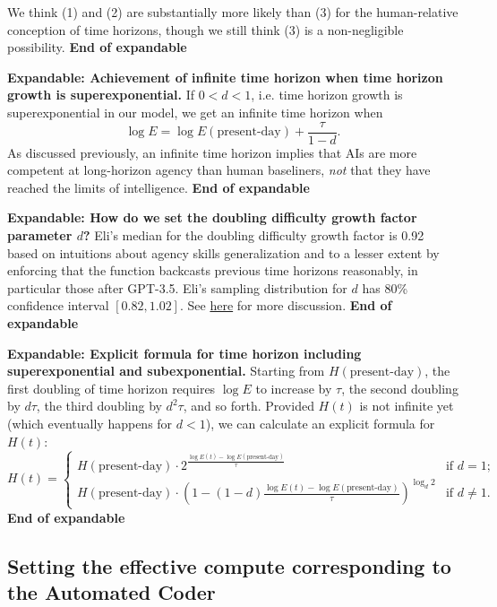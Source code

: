 \documentclass{article}
\theoremstyle{definition}
\begin{document}
We think (1) and (2) are substantially more likely than (3) for the human-relative conception of time horizons, though we still think (3) is a non-negligible possibility. \textbf{End of expandable}

\textbf{Expandable: Achievement of infinite time horizon when time horizon growth is superexponential.} If $0 < d < 1$, i.e. time horizon growth is superexponential in our model, we get an infinite time horizon when
\[ \log E = \log E(\text{present-day}) + \frac{\tau}{1-d}.\]
As discussed previously, an infinite time horizon implies that AIs are more competent at long-horizon agency than human baseliners, \textit{not} that they have reached the limits of intelligence. \textbf{End of expandable}

\textbf{Expandable: How do we set the doubling difficulty growth factor parameter $d$?} Eli's median for the doubling difficulty growth factor is 0.92 based on intuitions about agency skills generalization and to a lesser extent by enforcing that the function backcasts previous time horizons reasonably, in particular those after GPT-3.5. Eli's sampling distribution for $d$ has 80\% confidence interval $[0.82, 1.02]$. See \href{https://docs.google.com/document/d/1ru6Okbxb6XuH18Cz8439sdQJazMV39hNxsWDokh97r0/edit?tab=t.0#bookmark=kix.knb34i9ceqqy}{here} for more discussion. \textbf{End of expandable}

\textbf{Expandable: Explicit formula for time horizon including superexponential and subexponential.}
Starting from $H(\text{present-day})$, the first doubling of time horizon requires $\log E$ to increase by $\tau$, the second doubling by $d \tau$, the third doubling by $d^2 \tau$, and so forth. Provided $H(t)$ is not infinite yet (which eventually happens for $d < 1$), we can calculate an explicit formula for $H(t)$:
\[ H(t) = 
\begin{cases} 
H(\text{present-day}) \cdot 2^{\frac{\log E(t)-\log E(\text{present-day})}{\tau}} & \text{if $d = 1$}; \\
H(\text{present-day}) \cdot \left(1 - (1-d) \frac{\log E(t)-\log E(\text{present-day})}{\tau}\right)^{\log_d 2} & \text{if $d \neq 1$.}
\end{cases}
\]
\textbf{End of expandable}


\subsection{Setting the effective compute corresponding to the Automated Coder} \label{Automated Coder effective compute}
\end{document}
